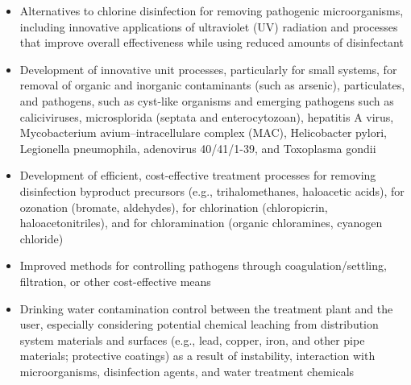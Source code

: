 \documentclass{article}
\begin{document}
\begin{itemize}
\item Alternatives to chlorine disinfection for removing pathogenic microorganisms, including innovative applications of ultraviolet (UV) radiation and processes that improve overall effectiveness while using reduced amounts of disinfectant
\item Development of innovative unit processes, particularly for small systems, for removal of organic and inorganic contaminants (such as arsenic), particulates, and pathogens, such as cyst-like organisms and emerging pathogens such as caliciviruses, microsplorida (septata and enterocytozoan), hepatitis A virus, Mycobacterium avium–intracellulare complex (MAC), Helicobacter pylori, Legionella pneumophila, adenovirus 40/41/1-39, and Toxoplasma gondii
\item Development of efficient, cost-effective treatment processes for removing disinfection byproduct precursors (e.g., trihalomethanes, haloacetic acids), for ozonation (bromate, aldehydes), for chlorination (chloropicrin, haloacetonitriles), and for chloramination (organic chloramines, cyanogen chloride)
\item Improved methods for controlling pathogens through coagulation/settling, filtration, or other cost-effective means
\item Drinking water contamination control between the treatment plant and the user, especially considering potential chemical leaching from distribution system materials and surfaces (e.g., lead, copper, iron, and other pipe materials; protective coatings) as a result of instability, interaction with microorganisms, disinfection agents, and water treatment chemicals
\end{itemize}
\end{document}
